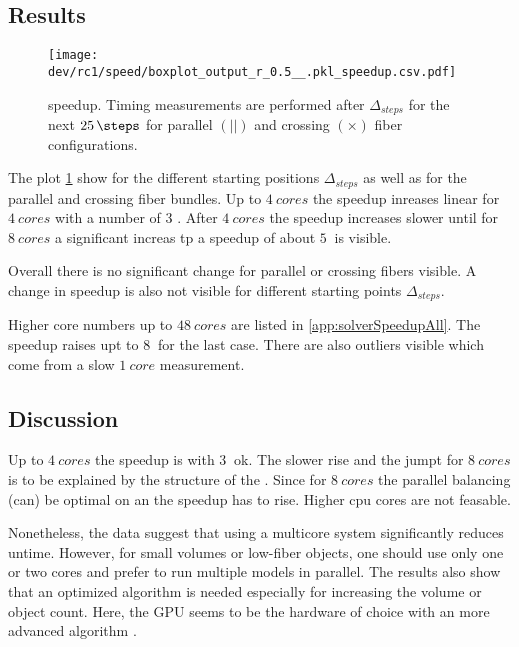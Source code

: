 \subsection{Results}
% 
\begin{figure}[!t]
\centering
\texttt{[image: dev/rc1/speed/boxplot\_output\_r\_0.5\_\_.pkl\_speedup.csv.pdf]}
\caption{ speedup. Timing measurements are performed after $\Delta_{\mathit{steps}}$ for the next $\SI{25}{\steps}$ for parallel $(||)$ and crossing $(\times)$ fiber configurations.}
\label{fig:solverSpeedup}
\end{figure}
% 
The plot \cref{fig:solverSpeedup} show for the different starting positions $\Delta_{\mathit{steps}}$ as well as for the parallel and crossing fiber bundles.
Up to $\SI{4}{cores}$ the speedup inreases linear for $\SI{4}{cores}$ with a number of 3 \dummy{}.
After $\SI{4}{cores}$ the speedup increases slower until for $\SI{8}{cores}$ a significant increas tp a speedup of about $\SI{5}{}$ is visible.
\par
% 
Overall there is no significant change for parallel or crossing fibers visible.
A change in speedup is also not visible for different starting points $\Delta_{\mathit{steps}}$.
\par
% 
Higher core numbers up to $\SI{48}{cores}$ are listed in \cref{app:solverSpeedupAll}.
The speedup raises upt to $\SI{8}{}$ for the last case.
There are also outliers visible which come from a slow $\SI{1}{core}$ measurement.
% 
% 
% 
\subsection{Discussion}
% 
Up to $\SI{4}{cores}$ the speedup is with $\SI{3}{}$ ok.
The slower rise and the jumpt for $\SI{8}{cores}$ is to be explained by the structure of the .
Since for $\SI{8}{cores}$ the parallel balancing (can) be optimal on an  the speedup has to rise.
Higher cpu cores are not feasable.
\par
% 
Nonetheless, the data suggest that using a multicore system significantly reduces untime.
However, for small volumes or low-fiber objects, one should use only one or two cores and prefer to run multiple models in parallel.
The results also show that an optimized algorithm is needed especially for increasing the volume or object count.
Here, the \ac{GPU} seems to be the hardware of choice with an more advanced algorithm \cite{Karras2012}.
% 
%
%
